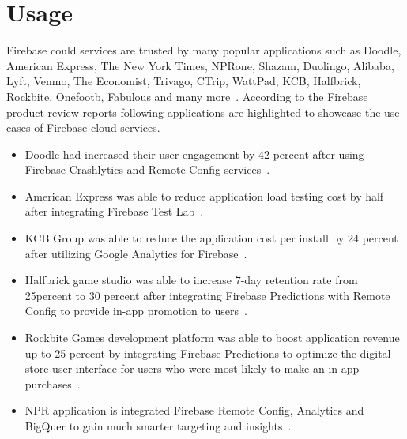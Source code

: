 \section{Usage} 

Firebase could services are trusted by many popular applications such
as Doodle\cite{hid-sp18-409-www-doodle}, American
Express\cite{hid-sp18-409-www-americanexpress}, The New York
Times\cite{hid-sp18-409-www-nytimes},
NPRone\cite{hid-sp18-409-www-npr},
Shazam\cite{hid-sp18-409-www-shazam},
Duolingo\cite{hid-sp18-409-www-duolingo},
Alibaba\cite{hid-sp18-409-www-alibaba},
Lyft\cite{hid-sp18-409-www-lyft}, Venmo\cite{hid-sp18-409-www-venmo},
The Economist\cite{hid-sp18-409-www-economist},
Trivago\cite{hid-sp18-409-www-trivago},
CTrip\cite{hid-sp18-409-www-ctrip},
WattPad\cite{hid-sp18-409-www-wattpad},
KCB\cite{hid-sp18-409-www-kcbgroup},
Halfbrick\cite{hid-sp18-409-www-halfbrick},
Rockbite\cite{hid-sp18-409-www-rockbitegames},
Onefootb\cite{hid-sp18-409-www-onefootball},
Fabulous\cite{hid-sp18-409-www-thefabulous} and many
more~\cite{hid-sp18-409-www-firebase,
  hid-sp18-409-www-firebase-usecases}.  According to the Firebase
product review reports following applications are highlighted to
showcase the use cases of Firebase cloud services.

\begin{itemize} \item Doodle had increased their user engagement by 42
  percent after using Firebase Crashlytics and Remote Config
  services~\cite{hid-sp18-409-www-doodle,
    hid-sp18-409-www-firebase-usecases}.
	
\item American Express was able to reduce application load testing
  cost by half after integrating Firebase Test
  Lab~\cite{hid-sp18-409-www-americanexpress}.
	
\item KCB Group was able to reduce the application cost per install by
  24 percent after utilizing Google Analytics for
  Firebase~\cite{hid-sp18-409-www-kcbgroup,hid-sp18-409-www-firebase-usecases}.
	
\item Halfbrick game studio was able to increase 7-day retention rate
  from 25percent to 30 percent after integrating Firebase Predictions
  with Remote Config to provide in-app promotion to
  users~\cite{hid-sp18-409-www-halfbrick,hid-sp18-409-www-firebase-usecases}.
	
\item Rockbite Games development platform was able to boost
  application revenue up to 25 percent by integrating Firebase
  Predictions to optimize the digital store user interface for users
  who were most likely to make an in-app
  purchases~\cite{hid-sp18-409-www-rockbitegames}.
	
\item NPR application is integrated Firebase Remote Config, Analytics
  and BigQuer to gain much smarter targeting and
  insights~\cite{hid-sp18-409-www-firebase-usecases}. 

\end{itemize}

